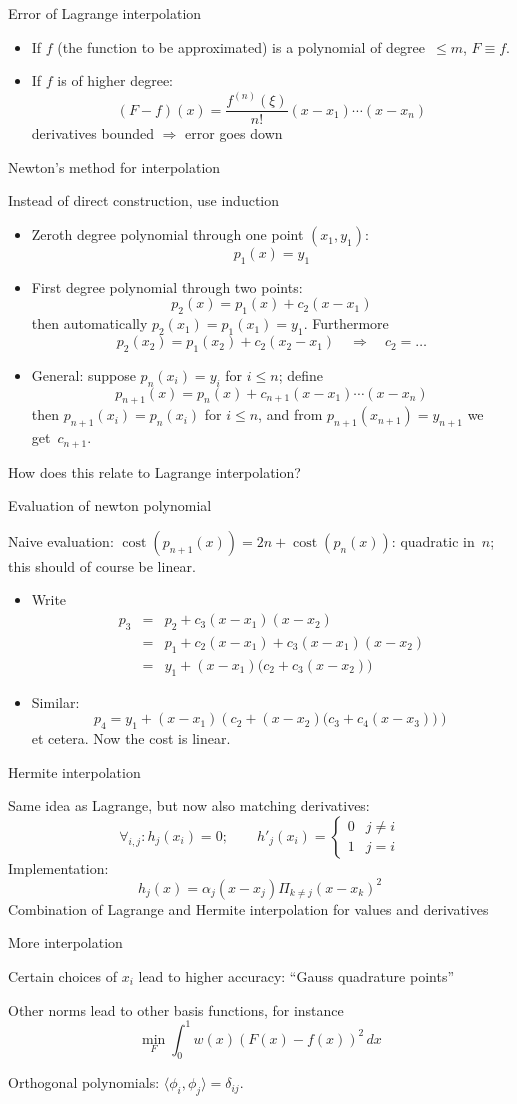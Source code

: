  {Error of Lagrange interpolation}

  \begin{itemize}
  \item If $f$ (the function to be approximated) is a polynomial of
    degree~$\leq m$, $F\equiv f$.
  \item If $f$ is of higher degree:
    \[ (F-f)(x)=\frac{f^{(n)}(\xi)}{n!}(x-x_1)\cdots(x-x_n) \]
    derivatives bounded $\Rightarrow$ error goes down
  \end{itemize}


 {Newton's method for interpolation}

Instead of direct construction, use induction
\begin{itemize}
\item Zeroth degree polynomial through one point $(x_1,y_1)$:
\[ p_1(x)=y_1 \]
\item First degree polynomial through two points:
\[ p_2(x) = p_1(x)+c_2(x-x_1) \]
then automatically $p_2(x_1) = p_1(x_1)=y_1$. Furthermore
\[ p_2(x_2)=p_1(x_2)+c_2(x_2-x_1)\quad\Rightarrow\quad c_2=\ldots \]
\item General: suppose $p_n(x_i)=y_i$ for $i\leq n$; define
\[ p_{n+1}(x)=p_n(x)+c_{n+1}(x-x_1)\cdots(x-x_n) \]
then $p_{n+1}(x_i)=p_n(x_i)$ for $i\leq n$, and
from $p_{n+1}(x_{n+1})=y_{n+1}$ we get~$c_{n+1}$.
\end{itemize}
How does this relate to Lagrange interpolation?


 {Evaluation of newton polynomial}

Naive evaluation:
  $\mathop{\mathrm{cost}}(p_{n+1}(x))=2n+\mathop{\mathrm{cost}}(p_n(x))$:
  quadratic in~$n$; this should of course be linear.
\begin{itemize}
\item Write
\begin{eqnarray*}p_3&=&p_2+c_3(x-x_1)(x-x_2)\\
&=&p_1+c_2(x-x_1)+c_3(x-x_1)(x-x_2)\\
&=&y_1+(x-x_1)\bigl(c_2+c_3(x-x_2)\bigr)
\end{eqnarray*}
\item Similar:
\[ p_4=y_1+(x-x_1)\left(c_2+(x-x_2)\bigl(c_3+c_4(x-x_3)\bigr)\right)\]
et cetera. Now the cost is linear.
\end{itemize}


 {Hermite interpolation}

  Same idea as Lagrange, but now also matching derivatives:
  \[ \forall_{i,j}\colon h_j(x_i)=0; \qquad
  h'_j(x_i)=
  \begin{cases}
    0&j\not=i\\ 1&j=i
  \end{cases}
  \]
  Implementation: \[ h_j(x)=\alpha_j(x-x_j)\Pi_{k\not=j}(x-x_k)^2 \]
  Combination of Lagrange and Hermite interpolation for values and derivatives


 {More interpolation}

  Certain choices of $x_i$ lead to higher accuracy: ``Gauss quadrature points''

  Other norms lead to other basis functions, for instance
  \[ \min_F \int_0^1 w(x)(F(x)-f(x))^2\,dx \]

  Orthogonal polynomials: $\langle \phi_i,\phi_j\rangle=\delta_{ij}$.

